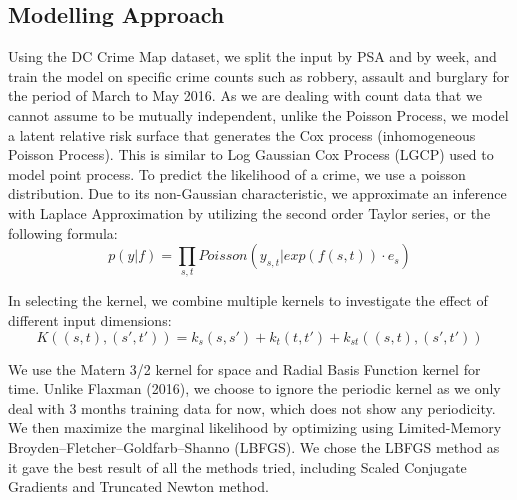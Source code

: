\documentclass[letterpaper]{article}
\begin{document}
	\subsection{Modelling Approach}
	Using the DC Crime Map dataset, we split the input by PSA and by week, and train the model on specific crime counts such as robbery, assault and burglary for the period of March to May 2016. 
	As we are dealing with count data that we cannot assume to be mutually independent, unlike the Poisson Process, we model a latent relative risk surface that generates the Cox process (inhomogeneous Poisson Process).
	This is similar to Log Gaussian Cox Process (LGCP) used to model point process.
	To predict the likelihood of a crime, we use a poisson distribution. Due to its non-Gaussian characteristic, we approximate an inference with Laplace Approximation by utilizing the second order Taylor series, or the following formula:
	\[p(y|f) = \prod_{s,t}Poisson(y_{s,t}|exp(f(s,t))\cdot e_s)\]

	In selecting the kernel, we combine multiple kernels to investigate the effect of different input dimensions:
	\[K((s,t),(s',t')) = k_s(s,s')+k_t(t,t')+k_{st}((s,t),(s',t'))\]

	We use the Matern 3/2 kernel for space and Radial Basis Function kernel for time.
	Unlike Flaxman (2016), we choose to ignore the periodic kernel as we only deal with 3 months training data for now, which does not show any periodicity.
	We then maximize the marginal likelihood by optimizing using Limited-Memory Broyden–Fletcher–Goldfarb–Shanno (LBFGS).
	We chose the LBFGS method as it gave the best result of all the methods tried, including Scaled Conjugate Gradients and Truncated Newton method.
	
\end{document}
